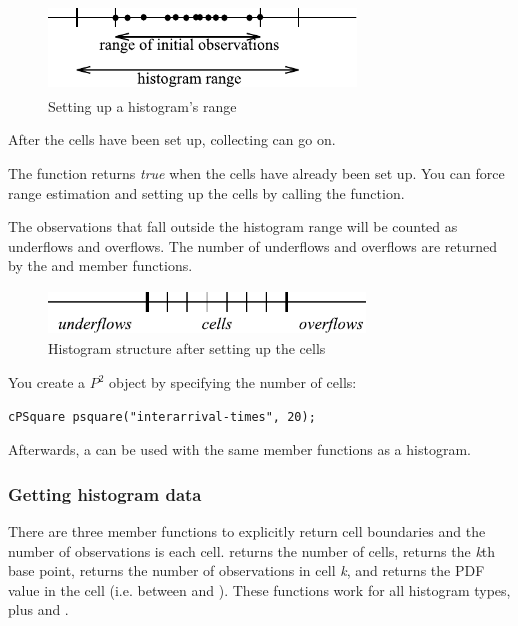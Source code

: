 \begin{figure}[htbp]
  \begin{center}
    \includegraphics[width=3.215in, height=0.930in]{figures/usmanFig12}
    \caption{Setting up a histogram's range}
  \end{center}
\end{figure}

After the cells have been set up, collecting can go on.

The  function returns \textit{true} when the cells have
already been set up. You can force range estimation and setting
up the cells by calling the  function.

The observations that fall outside the histogram range will be counted
as underflows and overflows. The number of underflows and overflows
are returned by the  and 
member functions.

\begin{figure}[htbp]
\begin{center}
  \includegraphics[width=3.310in, height=0.467in]{figures/usmanFig13}
  \caption{Histogram structure after setting up the cells}
\end{center}
\end{figure}

You create a $P^{2}$ object by specifying the number of cells:

\begin{verbatim}
cPSquare psquare("interarrival-times", 20);
\end{verbatim}

Afterwards, a  can be used with the same member functions
as a histogram.


\subsubsection{Getting histogram data}


There are three member functions to explicitly return cell boundaries
and the number of observations is each cell.  returns
the number of cells,  returns the
\textit{k}th base point,  returns the
number of observations in cell \textit{k}, and
 returns the PDF value in the cell
(i.e. between  and
).  These functions work for all
histogram types, plus  and .

